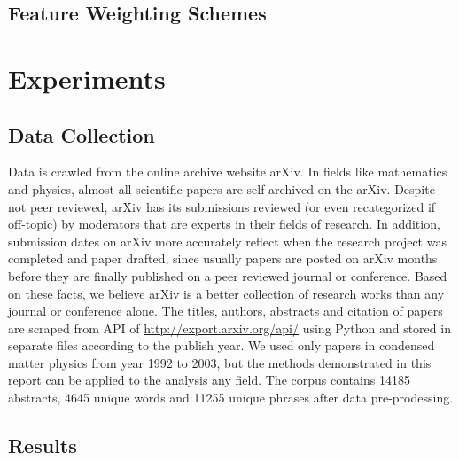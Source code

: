\documentclass[DIV=calc, paper=letter, fontsize=10pt, twocolumn]{scrartcl}	 %
\begin{document}
\subsection*{Feature Weighting Schemes}


\section*{Experiments}

\subsection*{Data Collection}
Data is crawled from the online archive website arXiv. In fields like mathematics and physics, almost all scientific papers are self-archived on the arXiv. Despite not peer reviewed, arXiv has its submissions reviewed (or even recategorized if off-topic) by moderators that are experts in their fields of research. In addition, submission dates on arXiv more accurately reflect when the research project was completed and paper drafted, since usually papers are posted on arXiv months before they are finally published on a peer reviewed journal or conference. Based on these facts, we believe arXiv is a better collection of research works than any journal or conference alone.\newline
The titles, authors, abstracts and citation of papers are scraped from API of \url{http://export.arxiv.org/api/} using Python and stored in separate files according to the publish year. We used only papers in condensed matter physics from year 1992 to 2003, but the methods demonstrated in this report can be applied to the analysis any field. The corpus contains 14185 abstracts, 4645 unique words and 11255 unique phrases after data pre-prodessing.


\subsection*{Results}
\end{document}

